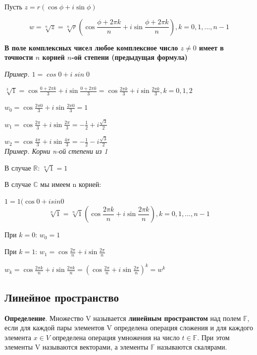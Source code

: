 \documentclass[a4paper]{article}
\begin{document}
    Пусть $z = r(\cos \phi + i \sin \phi)$

    \begin{equation}
        \displaystyle w = \sqrt[n]{z} = \sqrt[n]{r} \left( \cos \frac{\phi + 2\pi k}{n} + i \sin \frac{\phi + 2\pi k}{n} \right), k = 0,1,...,n-1
    \end{equation}

    \textbf{В поле комплексных чисел любое комплексное число $z \neq 0$ имеет в точности $n$ корней $n$-ой степени (предыдущая формула)}

    \textit{Пример. $\mathit{1 = \cos 0 + i \sin 0}$}

    $\displaystyle \sqrt[3]{1} = \cos \frac{0+2\pi k}{3} + i \sin \frac{0 + 2\pi k}{3} = \cos \frac{2 \pi k}{3} + i \sin \frac{2 \pi k}{3}, k = 0,1,2$

    $\displaystyle w_0 = \cos \frac{2 \pi 0}{3} + i \sin \frac{2 \pi 0}{3} = 1$

    $\displaystyle w_1 = \cos \frac{2 \pi}{3} + i \sin \frac{2 \pi}{3} = -\frac{1}{2} + i\frac{\sqrt{3}}{2}$

    $\displaystyle w_2 = \cos \frac{4 \pi}{3} + i \sin \frac{4 \pi}{3} = -\frac{1}{2} - i\frac{\sqrt{3}}{2}$\\

    \textit{Пример. Корни n-ой степени из 1}

    В случае $\mathbb{R}$: $\sqrt[n]{1} = 1$

    В случае $\mathbb{C}$ мы имеем n корней:

    $1 = 1(\cos 0 + i sin 0$
    \begin{equation}
        \displaystyle \sqrt[n]{1} = \sqrt[n]{1} \left( \cos \frac{2\pi k}{n} + i \sin \frac{2 \pi k}{n} \right), k=0,1,...,n-1
    \end{equation}


    При $k=0$: $w_0 = 1$

    При $k=1$: $\displaystyle w_1 = \cos \frac{2\pi}{n} + i \sin \frac{2\pi}{n}$

    $\displaystyle w_k = \cos \frac{2\pi k}{n} + i \sin \frac{2 \pi k}{n} = \left( \cos \frac{2\pi}{n} + i \sin \frac{2 \pi}{n} \right)^k = w^k$


    \newpage \begin{center}
                 \begin{Large}
                 \end{Large}
    \end{center}
    \subsection*{Линейное пространство}
    \textbf{Определение}. Множество V называется \textbf{линейным пространстом} над полем $\mathbb{F}$, если для каждой пары элементов V определена операция сложения и для каждого элемента $x \in V$ определена операция умножения на число $t \in \mathbb{F}$. При этом элементы V называются векторами, а элементы $\mathbb{F}$ называются скалярами.
\end{document}
